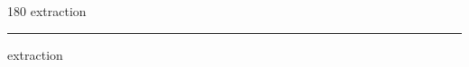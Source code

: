 
\begin{frame}
\begin{center}
\begin{turn}{180}
{\fontsize{2.5cm}{1em}\selectfont extraction}
\end{turn}
\vspace{1em}\par  
\hrule
\vspace{1em}\par  
{\fontsize{2.5cm}{1em}\selectfont extraction}
\end{center}
\end{frame}
